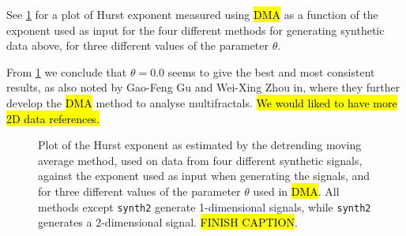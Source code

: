 See \cref{fig:dma_performace} for a plot of Hurst exponent measured using \hl{DMA} as a function of the exponent used as input for the four different methods for generating synthetic data above, for three different values of the parameter $\theta$.

From \cref{fig:dma_performace} we conclude that $\theta = 0.0$ seems to give the best and most consistent results, as also noted by Gao-Feng Gu and Wei-Xing Zhou in\cite{gu2010detrending}, where they further develop the \hl{DMA} method to analyse multifractals. \hl{We would liked to have more 2D data references.}
%
\begin{figure}[htpb]%
    \centering%
    {
        \newcommand{\f}{\footnotesize}%
        \newcommand{\x}{\text}%
        \newcommand{\thislabelaaaaaa}{{\f $H_\x{in}=H_\x{out}$}}%
    }
    \caption{%
        Plot of the Hurst exponent as estimated by the detrending moving average method, used on data from four different synthetic signals, against the exponent used as input when generating the signals, and for three different values of the parameter $\theta$ used in \hl{DMA}. All methods except \texttt{synth2} generate 1-dimensional signals, while \texttt{synth2} generates a 2-dimensional signal. \hl{FINISH CAPTION}. %
        \label{fig:dma_performace}%
    }%
\end{figure}%

